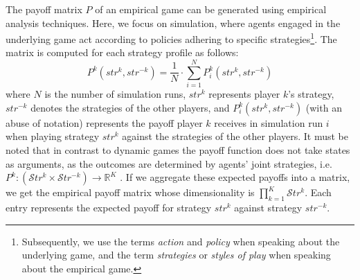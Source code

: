         \noindent
        The payoff matrix $P$ of an empirical game can be generated using empirical analysis techniques. Here, we focus on simulation, where agents engaged in the underlying game act according to policies adhering to specific strategies\footnote{Subsequently, we use the terms \emph{action} and \emph{policy} when speaking about the underlying game, and the term \emph{strategies} or \emph{styles of play} when speaking about the empirical game.}. The matrix is computed for each strategy profile as follows:
        \begin{equation}
            P^k(str^k, str^{-k}) =\frac{1}{N} \cdot \sum_{i=1}^{N} P^k_{i}(str^k, str^{-k})
            \label{eq:meta_payoff}
        \end{equation}
        where $N$ is the number of simulation runs, $str^k$ represents player $k$'s strategy, $str^{-k}$ denotes the strategies of the other players, and $P^k_{i}(str^k, str^{-k})$ (with an abuse of notation) represents the payoff player $k$ receives in simulation run $i$ when playing strategy $str^k$ against the strategies of the other players. It must be noted that in contrast to dynamic games the payoff function does not take states as arguments, as the outcomes are determined by agents' joint strategies, i.e. $P^k: (\mathcal{S}tr^k \times \mathcal{S}tr^{-k}) \to \mathbb{R}^K$ \cite{omidshafiei2019alpharank}. If we aggregate these expected payoffs into a matrix, we get the empirical payoff matrix whose dimensionality is $\prod_{k=1}^K\mathcal{S}tr^k$. Each entry represents the expected payoff for strategy $str^k$ against strategy $str^{-k}$.